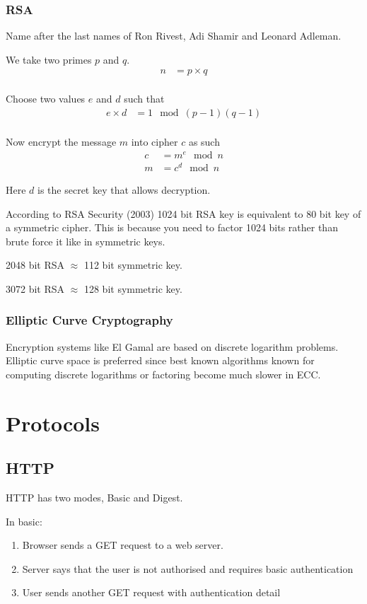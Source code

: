 \documentclass{report}
\begin{document}
\subsection{RSA}
Name after the last names of Ron Rivest, Adi Shamir and Leonard Adleman.

We take two primes $p$ and $q$.
\begin{align*}
    n &= p \times q \\
\end{align*}

Choose two values $e$ and $d$ such that
\begin{align*}
    e \times d &= 1 \mod (p-1)(q-1) \\
\end{align*}

Now encrypt the message $m$ into cipher $c$ as such
\begin{align*}
    c &= m^e \mod n \\
    m &= c^d \mod n
\end{align*}

Here $d$ is the secret key that allows decryption.

According to RSA Security (2003) 1024 bit RSA key is equivalent to 80 bit key of
a symmetric cipher. This is because you need to factor 1024 bits rather than
brute force it like in symmetric keys.

2048 bit RSA $\approx$ 112 bit symmetric key.

3072 bit RSA $\approx$ 128 bit symmetric key.

\subsection{Elliptic Curve Cryptography}
Encryption systems like El Gamal are based on discrete logarithm problems.
Elliptic curve space is preferred since best known algorithms known for
computing discrete logarithms or factoring become much slower in ECC\@.

\chapter{Protocols}
\section{HTTP}
HTTP has two modes, Basic and Digest.

In basic:
\begin{enumerate}
    \item Browser sends a GET request to a web server.
    \item Server says that the user is not authorised
        and requires basic authentication
    \item User sends another GET request with authentication detail
\end{enumerate}
\end{document}
